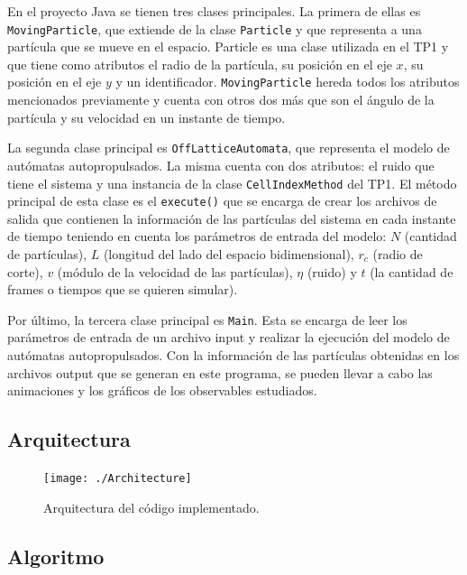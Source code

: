 \documentclass[11pt, a4paper]{article}
\begin{document}
    En el proyecto Java se tienen tres clases principales. La primera de ellas es \texttt{MovingParticle}, que extiende de
    la clase \texttt{Particle} y que representa a una partícula que se mueve en el espacio. Particle es una clase utilizada en el
    TP1 y que tiene como atributos el radio de la partícula, su posición en el eje $x$, su posición en el eje $y$ y un
    identificador. \texttt{MovingParticle} hereda todos los atributos mencionados previamente y cuenta con otros dos más que son
    el ángulo de la partícula y su velocidad en un instante de tiempo.

    La segunda clase principal es \texttt{OffLatticeAutomata}, que representa el modelo de autómatas autopropulsados. La misma cuenta
    con dos atributos: el ruido que tiene el sistema y una instancia de la clase \texttt{CellIndexMethod} del TP1. El método principal de esta clase
    es el \texttt{execute()} que se encarga de crear los archivos de salida que contienen la información de las partículas del sistema
    en cada instante de tiempo teniendo en cuenta los parámetros de entrada del modelo: $N$ (cantidad de partículas), $L$ (longitud
    del lado del espacio bidimensional), $r_c$ (radio de corte), $v$ (módulo de la velocidad de las partículas), $\eta$ (ruido) y
    $t$ (la cantidad de frames o tiempos que se quieren simular).

    Por último, la tercera clase principal es \texttt{Main}. Esta se encarga de leer los parámetros de entrada de un archivo input y
    realizar la ejecución del modelo de autómatas autopropulsados. Con la información de las partículas obtenidas en los archivos
    output que se generan en este programa, se pueden llevar a cabo las animaciones y los gráficos de los observables estudiados.

        \subsection{Arquitectura}

            \begin{figure}[htbp]
                \centering
                \texttt{[image: ./Architecture]}
                \caption{Arquitectura del código implementado.}
                \label{fig:my_png}
            \end{figure}

        \subsection{Algoritmo}
\end{document}
